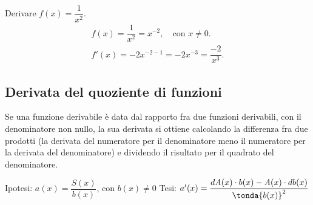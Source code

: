 \begin{esempio}
 Derivare \(f(x)=\dfrac{1}{x^2}\).\\
 \begin{align*}
  f(x)= \dfrac{1}{x^2}= x^{-2},\quad \text{con }x\ne 0.\\
  f'(x)=-2x^{-2-1}=-2x^{-3}=\dfrac{-2}{x^3}.
 \end{align*}
\end{esempio}

\subsection{Derivata del quoziente di funzioni}
\label{subsec:differenziazione_derivataquoziente}
\begin{teorema}
 Se una funzione derivabile è data dal rapporto fra due funzioni derivabili, 
con il denominatore non nullo, la sua derivata si ottiene calcolando
 la differenza fra due prodotti (la derivata del numeratore per il 
 denominatore meno il numeratore per la derivata del 
denominatore) e dividendo il risultato per il quadrato del denominatore.
\end{teorema}
\noindent Ipotesi: \(a(x)=\dfrac{\mathit{S}(x)}{b(x)}\), 
con \(b(x)\neq 0\) \tab 
Tesi: 
\(a'(x) = \dfrac{d\mathit{A}(x) \cdot b(x)-\mathit{A}(x) \cdot db(x)}
             {\tonda{b(x)}^2}\)

